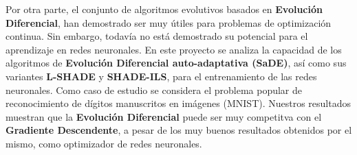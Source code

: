 \documentclass[../proyecto.tex]{memoir}
\begin{document}
Por otra parte, el conjunto de algoritmos evolutivos basados en \textbf{Evolución Diferencial}, han demostrado ser muy útiles para problemas de optimización continua. Sin embargo, todavía no está demostrado su potencial para el aprendizaje en redes neuronales. En este proyecto se analiza la capacidad de los algoritmos de \textbf{Evolución Diferencial auto-adaptativa (SaDE)}, así como sus variantes \textbf{L-SHADE} y \textbf{SHADE-ILS}, para el entrenamiento de las redes neuronales. Como caso de estudio se considera el problema popular de reconocimiento de dígitos manuscritos en imágenes (MNIST). Nuestros resultados muestran que la  \textbf{Evolución Diferencial} puede ser muy competitva con el \textbf{Gradiente Descendente}, a pesar de los muy buenos resultados obtenidos por el mismo,  como optimizador de redes neuronales.

\newpage
\end{document}
